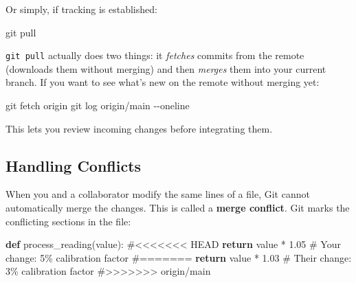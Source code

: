 \documentclass[
  letterpaper,
  DIV=11,
  numbers=noendperiod]{scrreprt}
\newenvironment{Shaded}{\begin{snugshade}}{\end{snugshade}}
\newcommand{\AttributeTok}[1]{\textcolor[rgb]{0.40,0.45,0.13}{#1}}
\newcommand{\CommentTok}[1]{\textcolor[rgb]{0.37,0.37,0.37}{#1}}
\newcommand{\ControlFlowTok}[1]{\textcolor[rgb]{0.00,0.23,0.31}{\textbf{#1}}}
\newcommand{\FloatTok}[1]{\textcolor[rgb]{0.68,0.00,0.00}{#1}}
\newcommand{\FunctionTok}[1]{\textcolor[rgb]{0.28,0.35,0.67}{#1}}
\newcommand{\KeywordTok}[1]{\textcolor[rgb]{0.00,0.23,0.31}{\textbf{#1}}}
\newcommand{\NormalTok}[1]{\textcolor[rgb]{0.00,0.23,0.31}{#1}}
\newcommand{\OperatorTok}[1]{\textcolor[rgb]{0.37,0.37,0.37}{#1}}
\begin{document}
Or simply, if tracking is established:

\begin{codelisting}

\caption{\texttt{terminal}}

\begin{Shaded}
\begin{Highlighting}[]
\FunctionTok{git}\NormalTok{ pull}
\end{Highlighting}
\end{Shaded}

\end{codelisting}

\texttt{git\ pull} actually does two things: it \emph{fetches} commits
from the remote (downloads them without merging) and then \emph{merges}
them into your current branch. If you want to see what's new on the
remote without merging yet:

\begin{codelisting}

\caption{\texttt{terminal}}

\begin{Shaded}
\begin{Highlighting}[]
\FunctionTok{git}\NormalTok{ fetch origin}
\FunctionTok{git}\NormalTok{ log origin/main }\AttributeTok{{-}{-}oneline}
\end{Highlighting}
\end{Shaded}

\end{codelisting}

This lets you review incoming changes before integrating them.

\subsection{Handling Conflicts}\label{handling-conflicts}

When you and a collaborator modify the same lines of a file, Git cannot
automatically merge the changes. This is called a \textbf{merge
conflict}. Git marks the conflicting sections in the file:

\begin{codelisting}

\caption{\texttt{analyze\_sensors.py}}

\begin{Shaded}
\begin{Highlighting}[]
\KeywordTok{def}\NormalTok{ process\_reading(value):}
\CommentTok{\#\textless{}\textless{}\textless{}\textless{}\textless{}\textless{}\textless{} HEAD}
    \ControlFlowTok{return}\NormalTok{ value }\OperatorTok{*} \FloatTok{1.05}  \CommentTok{\# Your change: 5\% calibration factor}
\CommentTok{\#=======}
    \ControlFlowTok{return}\NormalTok{ value }\OperatorTok{*} \FloatTok{1.03}  \CommentTok{\# Their change: 3\% calibration factor}
\CommentTok{\#\textgreater{}\textgreater{}\textgreater{}\textgreater{}\textgreater{}\textgreater{}\textgreater{} origin/main}
\end{Highlighting}
\end{Shaded}

\end{codelisting}
\end{document}
